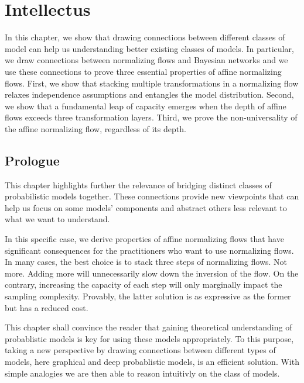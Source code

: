 \chapter{Intellectus}\label{ch:04}

\begin{chapter_outline}
  In this chapter, we show that drawing connections between different classes of model can help us understanding better existing classes of models.
  In particular, we draw connections between normalizing flows and Bayesian networks and we use these connections to prove three essential properties of affine normalizing flows.
  First, we show that stacking multiple transformations in a normalizing flow relaxes independence assumptions and entangles the model distribution.
  Second, we show that a fundamental leap of capacity emerges when the depth of affine flows exceeds three transformation layers.
  Third, we prove the non-universality of the affine normalizing flow, regardless of its depth.
\end{chapter_outline}

\section{Prologue}
This chapter highlights further the relevance of bridging distinct classes of probabilistic models together. These connections provide new viewpoints that can help us focus on some models' components and abstract others less relevant to what we want to understand.

In this specific case, we derive properties of affine normalizing flows that have significant consequences for the practitioners who want to use normalizing flows. In many cases, the best choice is to stack three steps of normalizing flows. Not more. Adding more will unnecessarily slow down the inversion of the flow. On the contrary, increasing the capacity of each step will only marginally impact the sampling complexity. Provably, the latter solution is as expressive as the former but has a reduced cost.

This chapter shall convince the reader that gaining theoretical understanding of probablistic models is key for using these models appropriately. To this purpose, taking a new perspective by drawing connections between different types of models, here graphical and deep probablistic models, is an efficient solution. With simple analogies we are then able to reason intuitivly on the class of models.

